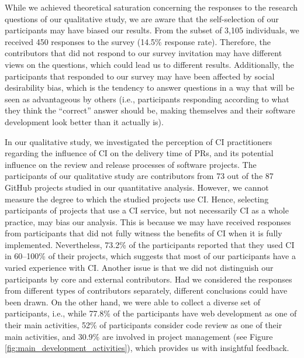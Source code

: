 While we achieved theoretical saturation concerning the responses to the research questions of our qualitative study, we are aware that the self-selection of our participants may have biased our results. From the subset of 3,105 individuals, we received 450 responses to the survey (14.5\% response rate). Therefore, the contributors that did not respond to our survey invitation may have different views on the questions, which could lead us to different results.
Additionally, the participants that responded to our survey may have been affected by social desirability bias, which is the tendency to answer questions in a way that will be seen as advantageous by others (i.e., participants responding according to what they think the ``correct'' answer should be, making themselves and their software development look better than it actually is).

In our qualitative study, we investigated the perception of CI practitioners regarding the influence of CI on the delivery time of PRs, and its potential influence on the review and release processes of software projects. The participants of our qualitative study are contributors from 73 out of the 87 GitHub projects studied in our quantitative analysis. 
However, we cannot measure the degree to which the studied projects use CI. Hence, selecting participants of projects that use a CI service, but not necessarily CI as a whole practice, may bias our analysis. This is because we may have received responses from participants that did not fully witness the benefits of CI when it is fully implemented.  
Nevertheless, 73.2\% of the participants reported that they used CI in 60--100\% of their projects, which suggests that most of our participants have a varied experience with CI. Another issue is that we did not distinguish our participants by core and external contributors. 
Had we considered the responses from different types of contributors separately, different conclusions could have been drawn. On the other hand, we were able to collect a diverse set of participants, i.e., while 77.8\% of the participants have web development as one of their main activities, 52\% of participants consider code review as one of their main activities, and 30.9\% are involved in project management (see 
Figure \ref{fig:main_development_activities}), which provides us with insightful feedback.
